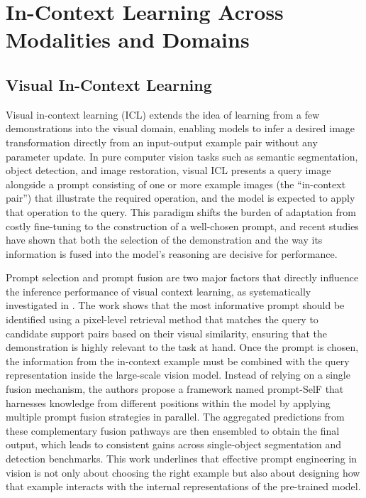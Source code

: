 \documentclass[11pt]{article}
\begin{document}
\section{In-Context Learning Across Modalities and Domains}

\subsection{Visual In-Context Learning}

Visual in-context learning (ICL) extends the idea of learning from a few demonstrations into the visual domain, enabling models to infer a desired image transformation directly from an input-output example pair without any parameter update. In pure computer vision tasks such as semantic segmentation, object detection, and image restoration, visual ICL presents a query image alongside a prompt consisting of one or more example images (the ``in-context pair'') that illustrate the required operation, and the model is expected to apply that operation to the query. This paradigm shifts the burden of adaptation from costly fine-tuning to the construction of a well-chosen prompt, and recent studies have shown that both the selection of the demonstration and the way its information is fused into the model's reasoning are decisive for performance.

Prompt selection and prompt fusion are two major factors that directly influence the inference performance of visual context learning, as systematically investigated in \cite{ref112}. The work shows that the most informative prompt should be identified using a pixel-level retrieval method that matches the query to candidate support pairs based on their visual similarity, ensuring that the demonstration is highly relevant to the task at hand. Once the prompt is chosen, the information from the in-context example must be combined with the query representation inside the large-scale vision model. Instead of relying on a single fusion mechanism, the authors propose a framework named prompt-SelF that harnesses knowledge from different positions within the model by applying multiple prompt fusion strategies in parallel. The aggregated predictions from these complementary fusion pathways are then ensembled to obtain the final output, which leads to consistent gains across single-object segmentation and detection benchmarks. This work underlines that effective prompt engineering in vision is not only about choosing the right example but also about designing how that example interacts with the internal representations of the pre-trained model.
\end{document}
